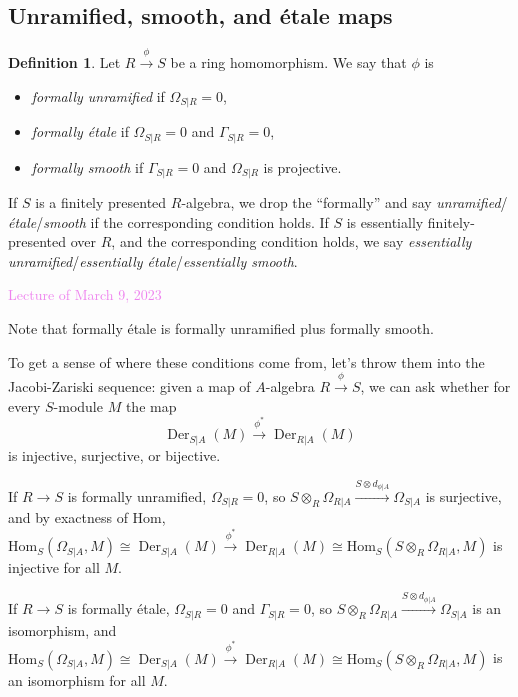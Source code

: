 \documentclass{amsart}[12pt]
\def\Der{\operatorname{Der}}
\newcommand{\Hom}{\mathrm{Hom}}
\newcommand{\Mar}[1]{\textcolor{violet}{Lecture of March #1, 2023}}
\numberwithin{equation}{section}
\theoremstyle{plain} %
\theoremstyle{definition}
\newtheorem{defn}[equation]{Definition}
\theoremstyle{remark}
\newcommand{\xra}[1]{\xrightarrow{#1}}
\begin{document}
\subsection{Unramified, smooth, and \'etale maps}


\begin{defn}
Let $R\xra{\phi} S$ be a ring homomorphism. We say that $\phi$ is
\begin{itemize}
\item \emph{formally unramified} if $\Omega_{S|R}=0$,
\item \emph{formally \'etale} if $\Omega_{S|R}=0$ and $\Gamma_{S|R}=0$,
\item \emph{formally smooth} if $\Gamma_{S|R}=0$ and $\Omega_{S|R}$ is projective.
\end{itemize}
If $S$ is a finitely presented $R$-algebra, we drop the ``formally'' and say \emph{unramified}/\emph{\'etale}/\emph{smooth} if the corresponding condition holds. If $S$ is essentially finitely-presented over $R$, and the corresponding condition holds, we say \emph{essentially unramified}/\emph{essentially \'etale}/\emph{essentially smooth}.
\end{defn}

\Mar{9}


Note that formally \'etale is formally unramified plus formally smooth.

To get a sense of where these conditions come from, let's throw them into the Jacobi-Zariski sequence: given a map of $A$-algebra $R\xra{\phi} S$, we can ask whether for every $S$-module $M$ the map
\[ \Der_{S|A}(M) \xra{\phi^*} \Der_{R|A}(M) \]
is injective, surjective, or bijective.

If $R\to S$ is formally unramified, $\Omega_{S|R} =0$, so $S\otimes_R \Omega_{R|A} \xra{S\otimes d_{\phi|A}} \Omega_{S|A}$ is surjective, and by exactness of Hom, $\Hom_{S}(\Omega_{S|A},M)\cong \Der_{S|A}(M) \xra{\phi^*} \Der_{R|A}(M)\cong \Hom_S(S\otimes_R \Omega_{R|A},M)$ is injective for all $M$.

If $R\to S$ is formally \'etale, $\Omega_{S|R}=0$ and $\Gamma_{S|R}=0$, so $S\otimes_R \Omega_{R|A} \xra{S\otimes d_{\phi|A}} \Omega_{S|A}$ is an isomorphism, and $\Hom_{S}(\Omega_{S|A},M)\cong \Der_{S|A}(M) \xra{\phi^*} \Der_{R|A}(M)\cong \Hom_S(S\otimes_R \Omega_{R|A},M)$ is an isomorphism for all $M$.
\end{document}
